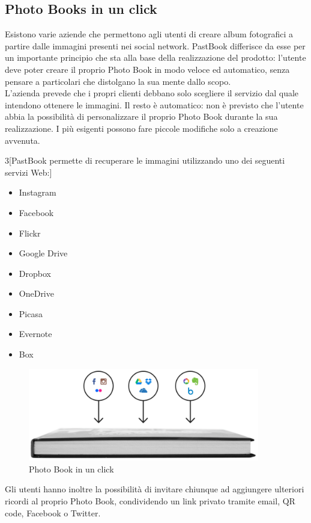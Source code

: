 		\subsection{Photo Books in un click}
			Esistono varie aziende che permettono agli utenti di creare album fotografici a partire dalle immagini presenti nei social
			network. PastBook differisce da esse per un importante principio che sta alla base della realizzazione del prodotto: l'utente
			deve poter creare il proprio Photo Book in modo veloce ed automatico, senza pensare a particolari che distolgano la sua mente
			dallo scopo.\\
			L'azienda prevede che i propri clienti debbano solo scegliere il servizio dal quale intendono ottenere le immagini. Il resto
			è automatico: non è previsto che l'utente abbia la possibilità di personalizzare il proprio Photo Book durante la sua
			realizzazione. I più esigenti possono fare piccole modifiche solo a creazione avvenuta.\\
			\begin{multicols}{3}[\noindent PastBook permette di recuperare le immagini utilizzando uno dei seguenti servizi Web:]
				\begin{itemize}
					\item Instagram
					\item Facebook
					\item Flickr
					\item Google Drive
					\item Dropbox
					\item OneDrive
					\item Picasa
					\item Evernote
					\item Box
				\end{itemize}
			\end{multicols}
			\begin{figure}
				\centering
				\includegraphics[width=0.9\textwidth]{capitolo_1/immagini/photo_book_one_click.png}
				\caption[Photo Book in un click]{Photo Book in un click\protect\footnotemark}
			\end{figure}
			Gli utenti hanno inoltre la possibilità di invitare chiunque ad aggiungere ulteriori ricordi al proprio Photo Book,
			condividendo un link privato tramite email, QR code, Facebook o Twitter.
